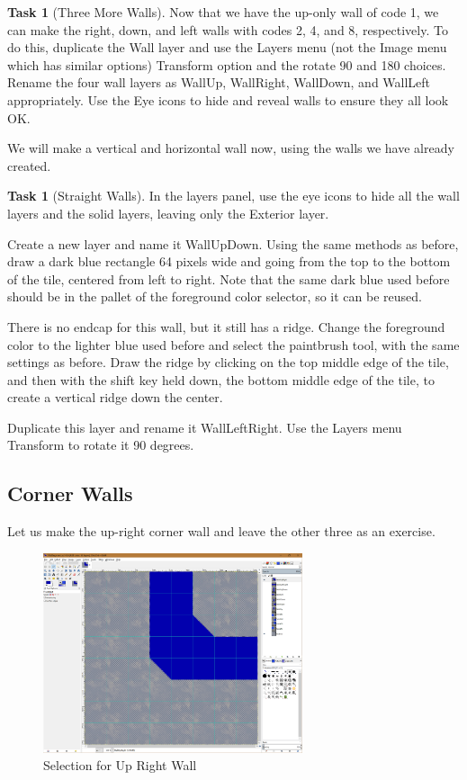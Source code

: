 \documentclass[12pt]{amsbook}
\theoremstyle{definition}
\newtheorem{task}[exercise]{Task}
\theoremstyle{remark}
\numberwithin{figure}{chapter}
\numberwithin{table}{chapter}
\numberwithin{section}{chapter}
\numberwithin{equation}{section}
\begin{document}
\begin{task}[Three More Walls]
Now that we have the up-only wall of code 1, we can make the right, down, and left walls with codes 2, 4, and 8, respectively.  To do this, duplicate the Wall layer and use the Layers menu (not the Image menu which has similar options) Transform option and the rotate 90 and 180 choices.  Rename the four wall layers as WallUp, WallRight, WallDown, and WallLeft appropriately.  Use the Eye icons to hide and reveal walls to ensure they all look OK.
\end{task}

We will make a vertical and horizontal wall now, using the walls we have already created.

\begin{task}[Straight Walls]
In the layers panel, use the eye icons to hide all the wall layers and the solid layers, leaving only the Exterior layer.

Create a new layer and name it WallUpDown.  Using the same methods as before, draw a dark blue rectangle 64 pixels wide and going from the top to the bottom of the tile, centered from left to right.  Note that the same dark blue used before should be in the pallet of the foreground color selector, so it can be reused.

There is no endcap for this wall, but it still has a ridge.  Change the foreground color to the lighter blue used before and select the paintbrush tool, with the same settings as before.  Draw the ridge by clicking on the top middle edge of the tile, and then with the shift key held down, the bottom middle edge of the tile, to create a vertical ridge down the center.

Duplicate this layer and rename it WallLeftRight. Use the Layers menu Transform to rotate it 90 degrees.
\end{task}

\subsection{Corner Walls}
Let us make the up-right corner wall and leave the other three as an exercise.


\begin{figure}[h]
  \includegraphics[width=3in]{WallUpRight.png}
  \caption{Selection for Up Right Wall}
  \label{fig:up-right-select}
\end{figure}
\end{document}
